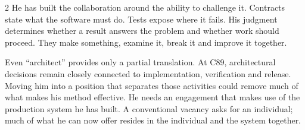 \begin{multicols}{2}
He has built the collaboration around the ability to challenge it. Contracts state what the software must do. Tests expose where it fails. His judgment determines whether a result answers the problem and whether work should proceed. They make something, examine it, break it and improve it together.


Even ``architect'' provides only a partial translation. At C89, architectural decisions remain closely connected to implementation, verification and release. Moving him into a position that separates those activities could remove much of what makes his method effective. He needs an engagement that makes use of the production system he has built. A conventional vacancy asks for an individual; much of what he can now offer resides in the individual and the system together.
\end{multicols}
\clearpage

